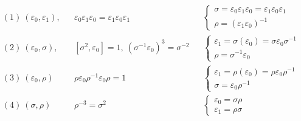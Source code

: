 \documentclass[11pt,a4paper]{article}
\begin{document}
\[
\begin{aligned}
&(1)\ (\varepsilon_0, \varepsilon_1), &&\boxed{\varepsilon_0\varepsilon_1\varepsilon_0 = \varepsilon_1\varepsilon_0\varepsilon_1}
&&\begin{cases} \sigma = \varepsilon_0\varepsilon_1\varepsilon_0 = \varepsilon_1\varepsilon_0\varepsilon_1 \\ \rho = (\varepsilon_1\varepsilon_0)^{-1} \end{cases} \\
&(2)\ (\varepsilon_0, \sigma), &&\boxed{[\sigma^2, \varepsilon_0] = 1, \ (\sigma^{-1}\varepsilon_0)^3 = \sigma^{-2}}
&&\begin{cases} \varepsilon_1 = \sigma(\varepsilon_0) = \sigma\varepsilon_0\sigma^{-1} \\ \rho = \sigma^{-1}\varepsilon_0 \end{cases} \\
&(3)\ (\varepsilon_0, \rho) &&\boxed{\rho\varepsilon_0\rho^{-1}\varepsilon_0\rho = 1}
&&\begin{cases} \varepsilon_1 = \rho(\varepsilon_0) = \rho\varepsilon_0\rho^{-1} \\ \sigma = \varepsilon_0\rho^{-1} \end{cases} \\
&(4)\ (\sigma, \rho) &&\boxed{\rho^{-3} = \sigma^2}
&&\begin{cases} \varepsilon_0 = \sigma\rho \\ \varepsilon_1 = \rho\sigma \end{cases}
\end{aligned}
\]
\end{document}
